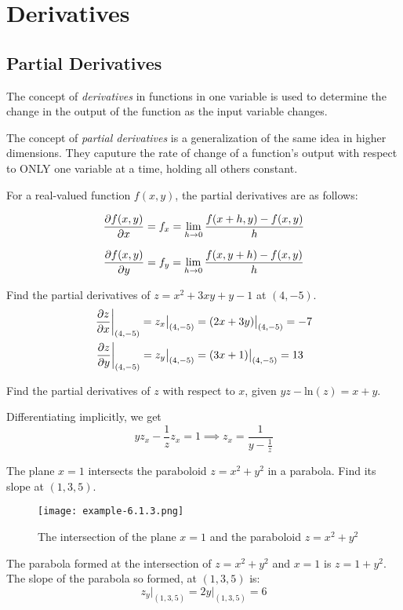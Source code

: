 \section{Derivatives}

\subsection{Partial Derivatives}
The concept of \textit{derivatives} in functions in one variable is used to determine the change in the output of the
function as the input variable changes.

The concept of \textit{partial derivatives} is a generalization of the same idea in higher dimensions. They caputure the
rate of change of a function's output with respect to ONLY one variable at a time, holding all others constant.

For a real-valued function $f(x, y)$, the partial derivatives are as follows:

\begin{equation}
    \frac{\partial f(x, y)}{\partial x} = f_x = \lim_{h \to 0} \frac{f(x+h, y) - f(x, y)}{h}
\end{equation}

\begin{equation}
    \frac{\partial f(x, y)}{\partial y} = f_y = \lim_{h \to 0} \frac{f(x, y+h) - f(x, y)}{h}
\end{equation}

\begin{example}
    \normalfont Find the partial derivatives of $z = x^2 + 3xy + y - 1$ at $(4, -5)$.
    \begin{align*}
        \frac{\partial z}{\partial x} \bigg|_{(4, -5)} = z_x \big|_{(4, -5)} &= (2x + 3y) \big|_{(4, -5)} = -7 \\
        \frac{\partial z}{\partial y} \bigg|_{(4, -5)} = z_y \big|_{(4, -5)} &= (3x + 1) \big|_{(4, -5)} = 13
    \end{align*}
\end{example}

\begin{example}
    \normalfont Find the partial derivatives of $z$ with respect to $x$, given $yz - \text{ln}(z) = x + y$.

    Differentiating implicitly, we get
    $$yz_x - \frac{1}{z}z_x = 1 \implies z_x = \frac{1}{y - \frac{1}{z}}$$
\end{example}

\begin{example}
    \normalfont The plane $x = 1$ intersects the paraboloid $z = x^2 + y^2$ in a parabola. Find its slope at $(1, 3, 5)$.

    \begin{figure}[htp]
        \centering
        \texttt{[image: example-6.1.3.png]}
        \caption{The intersection of the plane $x=1$ and the paraboloid $z = x^2 + y^2$}
    \end{figure}

    The parabola formed at the intersection of $z = x^2 + y^2$ and $x = 1$ is $z = 1 + y^2$.
    The slope of the parabola so formed, at $(1, 3, 5)$ is:
    $$z_y \big|_{(1, 3, 5)} = 2y \big|_{(1, 3, 5)} = 6$$
\end{example}

